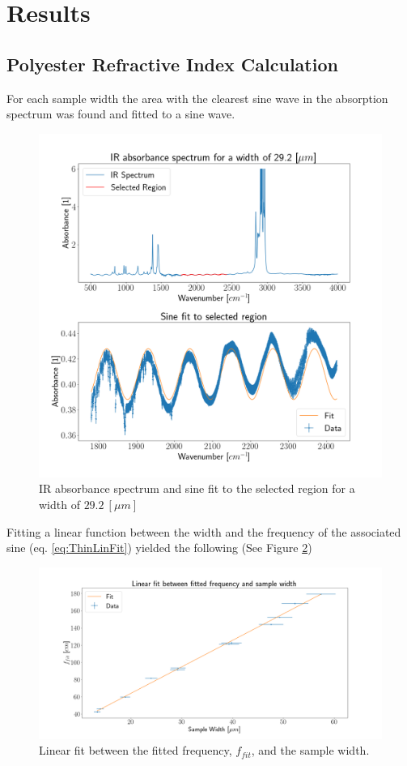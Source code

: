 \documentclass[reprint,amsmath,amssymb,aps, prl,superscriptaddress]{revtex4-2}
\begin{document}
\section{Results}

\subsection{Polyester Refractive Index Calculation}
For each sample width the area with the clearest sine wave in the absorption spectrum was found and fitted to a sine wave.
\begin{figure}[H]
    
    \includegraphics[width=\linewidth]{Images/29_2_Spec.png}
    \caption{IR absorbance spectrum and sine fit to the selected region for a width of $29.2\ [\mu m]$}
    \label{fig:SineFitEx}
    \centering
\end{figure}
Fitting a linear function between the width and the frequency of the associated sine (eq. \ref{eq:ThinLinFit}) yielded the following (See Figure \ref{fig:ThinLinWidthFreq})
\begin{figure}[H]
    \includegraphics[width=\linewidth]{Images/__linear_fit.png}
    \caption{Linear fit between the fitted frequency, $f_{fit}$, and the sample width.}
    \label{fig:ThinLinWidthFreq}
    \centering
\end{figure}
\end{document}
